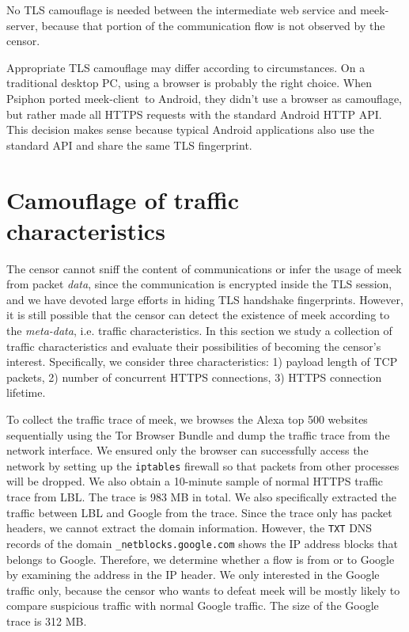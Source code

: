\documentclass[conference]{IEEEtran}
\def\meekclient{\mbox{meek-client}}
\def\meekserver{\mbox{meek-server}}
\begin{document}
No TLS camouflage is needed between the intermediate web service and \meekserver,
because that portion of the communication flow is not observed by the censor.

Appropriate TLS camouflage may differ according to circumstances.
On a traditional desktop PC, using a browser is probably the right choice.
When Psiphon ported \meekclient\ to Android,
they didn't use a browser as camouflage,
but rather made all HTTPS requests with the standard Android HTTP API.
This decision makes sense because typical Android applications
also use the standard API and share the same TLS fingerprint.

\section{Camouflage of traffic characteristics}
\label{sec:trafficstatistics}


The censor cannot sniff the content of communications or infer the usage of meek 
from packet \emph{data}, 
since the communication is encrypted inside the TLS session, and we have devoted large efforts 
in hiding TLS handshake fingerprints. However, it is still possible that the censor can detect 
the existence of meek according to the \emph{meta-data}, i.e. traffic characteristics. 
In this section we study a collection of traffic characteristics and evaluate their possibilities of becoming
the censor's interest. Specifically, we consider three characteristics: 1) payload length of
TCP packets, 2) number of concurrent HTTPS connections, 3) HTTPS connection lifetime. 

To collect the traffic trace of meek, we browses the Alexa top 500 websites sequentially using 
the Tor Browser Bundle and dump the traffic trace from the network interface. We ensured only
the browser can successfully access the network by setting
up the \texttt{iptables} firewall so that packets from other processes will be dropped. We also 
obtain a 10-minute sample of normal HTTPS traffic trace from LBL. The trace is 983 MB in total. 
We also specifically extracted the traffic between LBL and Google from the trace. Since the trace 
only has packet headers, we cannot extract the domain information. However, the \texttt{TXT} DNS
records of the domain \texttt{\_netblocks.google.com} shows the IP address blocks that belongs to
Google. Therefore, we determine whether a flow is from or to Google by examining the address in the 
IP header. We only interested in the Google traffic only, because the censor who wants to defeat meek
will be mostly likely to compare suspicious traffic with normal Google traffic. The size of the 
Google trace is 312 MB. 
\end{document}
